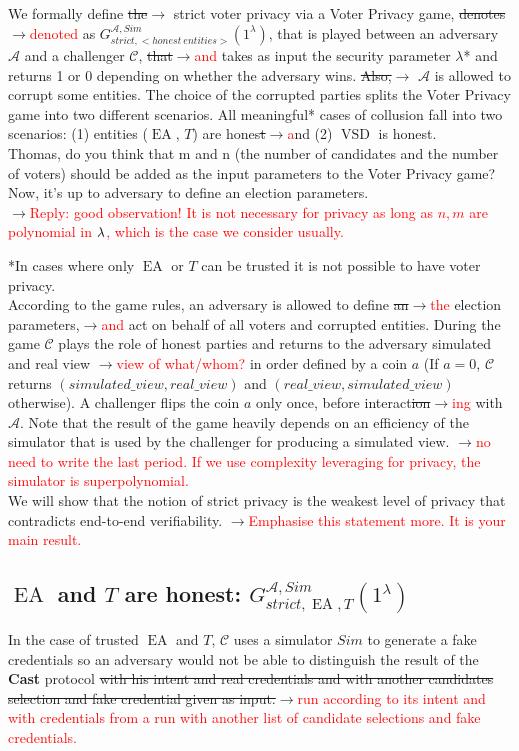 \documentclass[12pt]{article}
\newcommand{\fix}[2]{\sout{#1}$\rightarrow$\textcolor{red}{#2}}
\DeclareMathOperator{\vsd}{VSD}
\DeclareMathOperator{\ea}{EA}
\begin{document}
We formally define \fix{the}{} strict voter privacy via a Voter Privacy game, \fix{denotes}{denoted} as $G_{strict,<honest~entities>}^{\mathcal{A}, Sim}(1^{\lambda})$, that is played between an adversary $\mathcal{A}$ and a challenger $\mathcal{C}$, \fix{that}{and} takes as input the security parameter $\lambda${\color{red}*} and returns 1 or 0 depending on whether the adversary wins.  \fix{Also,}{} $\mathcal{A}$ is  allowed to corrupt some entities. The choice of the corrupted parties splits the Voter Privacy game into two different scenarios. All meaningful* cases of collusion fall into two scenarios: (1) entities ($\ea$, $T$) are hones\fix{t} and (2) $\vsd$ is honest. \\
{\color{blue} Thomas, do you think that m and n (the number of candidates and the number of voters)  should be added as the input parameters to the Voter Privacy game? Now, it's up to adversary to define an election parameters. }\\
\fix{}{Reply: good observation! It is not necessary for privacy as long as $n,m$ are polynomial in $\lambda$, which is the case we consider usually.}


*In cases where only $\ea$ or $T$ can be trusted it is not possible to have voter privacy. \\

 According to the game rules, an adversary is allowed to define \fix{an}{the} election parameters,\fix{}{and} act on behalf of all voters and corrupted entities. During the game $\mathcal{C}$ plays the role of honest parties and returns to the adversary simulated and real view \fix{}{view of what/whom?} in order defined by a coin $a$ (If $a=0$, $\mathcal{C}$ returns $(simulated\_view,real\_view)$ and  $(real\_view,simulated\_view)$ otherwise). A challenger flips the coin $a$ only once, before interact\fix{ion}{ing} with $\mathcal{A}$.  Note that the result of the game heavily depends on an efficiency of the simulator that is used by the challenger for producing a simulated view. \fix{}{no need to write the last period. If we use complexity leveraging for privacy, the simulator is superpolynomial.}\\

We will show that the notion of strict privacy is the weakest level of privacy that contradicts end-to-end verifiability. \fix{}{Emphasise this statement more. It is your main result.}

\subsection{$\ea$ and $T$ are honest: $G_{strict,\ea,T}^{\mathcal{A}, Sim}(1^{\lambda})$}
In the case of trusted $\ea$ and $T$,  $\mathcal{C}$ uses a simulator $Sim$ to generate a fake credentials so an adversary would not be able to distinguish the result of the \textbf{Cast} protocol \fix{with his intent and real credentials and with another candidates selection and fake credential given as input.}{run according to its intent and with credentials from a run with another list of candidate selections and fake credentials.} \\
\end{document}
